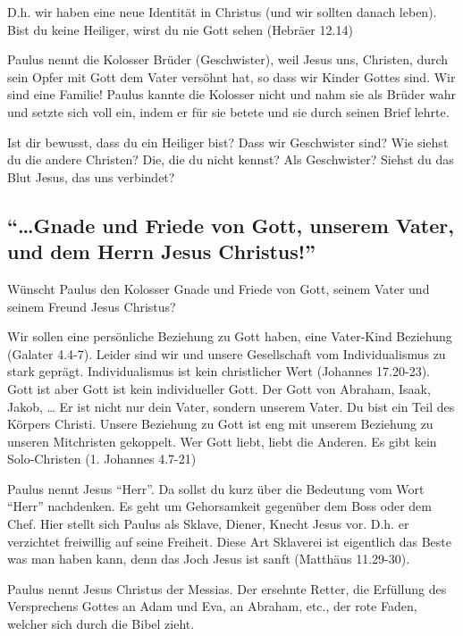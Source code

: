 \documentclass[
  12pt,
]{krantz}
\makeatletter
\newenvironment{kframe}{%
\medskip{}
\setlength{\fboxsep}{.8em}
 \def\at@end@of@kframe{}%
 \ifinner\ifhmode%
  \def\at@end@of@kframe{\end{minipage}}%
  \begin{minipage}{\columnwidth}%
 \fi\fi%
 \def\FrameCommand##1{\hskip\@totalleftmargin \hskip-\fboxsep
 \colorbox{shadecolor}{##1}\hskip-\fboxsep
     \hskip-\linewidth \hskip-\@totalleftmargin \hskip\columnwidth}%
 \MakeFramed {\advance\hsize-\width
   \@totalleftmargin\z@ \linewidth\hsize
   \@setminipage}}%
 {\par\unskip\endMakeFramed%
 \at@end@of@kframe}
\newenvironment{rmdblock}[1]
  {
  \begin{itemize}
  \renewcommand{\labelitemi}{
    \raisebox{-.7\height}[0pt][0pt]{
      {\setkeys{Gin}{width=3em,keepaspectratio}\texttt{[image: img/\#1]}}
    }
  }
  \setlength{\fboxsep}{1em}
  \begin{kframe}
  \item
  }
  {
  \end{kframe}
  \end{itemize}
  }
\newenvironment{rmdquestion}
  {\begin{rmdblock}{question}}
  {\end{rmdblock}}
\makeatother
\begin{document}
D.h. wir haben eine neue Identität in Christus (und wir sollten danach leben). Bist du keine Heiliger, wirst du nie Gott sehen (Hebräer 12.14)

Paulus nennt die Kolosser Brüder (Geschwister), weil Jesus uns, Christen, durch sein Opfer mit Gott dem Vater versöhnt hat, so dass wir Kinder Gottes sind. Wir sind eine Familie! Paulus kannte die Kolosser nicht und nahm sie als Brüder wahr und setzte sich voll ein, indem er für sie betete und sie durch seinen Brief lehrte.

\begin{rmdquestion}
Ist dir bewusst, dass du ein Heiliger bist? Dass wir Geschwister sind?
Wie siehst du die andere Christen? Die, die du nicht kennst? Als
Geschwister? Siehst du das Blut Jesus, das uns verbindet?
\end{rmdquestion}

\hypertarget{gnade-und-friede-von-gott-unserem-vater-und-dem-herrn-jesus-christus}{%
\subsection{``\ldots Gnade und Friede von Gott, unserem Vater, und dem Herrn Jesus Christus!''}\label{gnade-und-friede-von-gott-unserem-vater-und-dem-herrn-jesus-christus}}

Wünscht Paulus den Kolosser Gnade und Friede von Gott, seinem Vater und seinem Freund Jesus Christus?

Wir sollen eine persönliche Beziehung zu Gott haben, eine Vater-Kind Beziehung (Galater 4.4-7). Leider sind wir und unsere Gesellschaft vom Individualismus zu stark geprägt. Individualismus ist kein christlicher Wert (Johannes 17.20-23). Gott ist aber Gott ist kein individueller Gott. Der Gott von Abraham, Isaak, Jakob, \ldots{} Er ist nicht nur dein Vater, sondern unserem Vater. Du bist ein Teil des Körpers Christi. Unsere Beziehung zu Gott ist eng mit unserem Beziehung zu unseren Mitchristen gekoppelt. Wer Gott liebt, liebt die Anderen. Es gibt kein Solo-Christen (1. Johannes 4.7-21)

Paulus nennt Jesus ``Herr''. Da sollst du kurz über die Bedeutung vom Wort ``Herr'' nachdenken. Es geht um Gehorsamkeit gegenüber dem Boss oder dem Chef. Hier stellt sich Paulus als Sklave, Diener, Knecht Jesus vor. D.h. er verzichtet freiwillig auf seine Freiheit. Diese Art Sklaverei ist eigentlich das Beste was man haben kann, denn das Joch Jesus ist sanft (Matthäus 11.29-30).

Paulus nennt Jesus Christus der Messias. Der ersehnte Retter, die Erfüllung des Versprechens Gottes an Adam und Eva, an Abraham, etc., der rote Faden, welcher sich durch die Bibel zieht.
\end{document}
